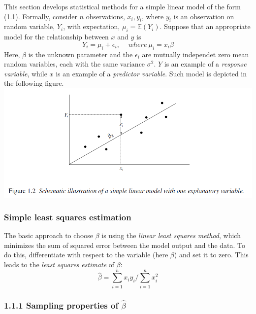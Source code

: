 \documentclass[
]{article}
\begin{document}
This section develops statistical methods for a simple linear model of
the form (1.1). Formally, consider \(n\) observations, \(x_i, y_i\),
where \(y_i\) is an observation on random variable, \(Y_i\), with
expectation, \(\mu_i = \mathbb{E}(Y_i)\). Suppose that an appropriate
model for the relationship between \(x\) and \(y\) is \begin{equation}
  Y_i = \mu_i + \epsilon_i, \quad \ where \ \mu_i = x_i \beta
\end{equation} Here, \(\beta\) is the unknown parameter and the
\(\epsilon_i\) are mutually independet zero mean random variables, each
with the same variance \(\sigma^2\). \(Y\) is an example of a
\emph{response variable}, while \(x\) is an example of a \emph{predictor
variable}. Such model is depicted in the following figure.
\includegraphics{images/cha1/lin_model.png}

\hypertarget{simple-least-squares-estimation}{%
\subsubsection{Simple least squares
estimation}\label{simple-least-squares-estimation}}

The basic approach to choose \(\beta\) is using the \emph{linear least
squares method}, which minimizes the sum of squared error between the
model output and the data. To do this, differentiate with respect to the
variable (here \(\beta\)) and set it to zero. This leads to the
\emph{least squares estimate} of \(\beta\): \begin{equation}
  \hat \beta = \sum_{i=1}^n x_i y_i / \sum_{i=1}^n x_i^2
\end{equation}

\hypertarget{sampling-properties-of-hat-beta}{%
\subsubsection{\texorpdfstring{1.1.1 Sampling properties of
\(\hat \beta\)}{1.1.1 Sampling properties of \textbackslash hat \textbackslash beta}}\label{sampling-properties-of-hat-beta}}
\end{document}
